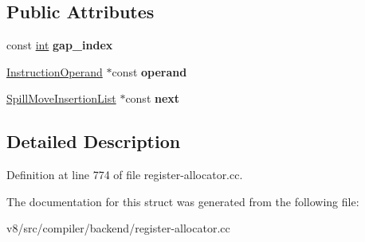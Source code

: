 \subsection*{Public Attributes}
\begin{DoxyCompactItemize}
\item 
\mbox{\label{structv8_1_1internal_1_1compiler_1_1TopLevelLiveRange_1_1SpillMoveInsertionList_a0e4f977b3614d4d7d3b464ddc769a811}} 
const \mbox{\hyperlink{classint}{int}} {\bfseries gap\+\_\+index}
\item 
\mbox{\label{structv8_1_1internal_1_1compiler_1_1TopLevelLiveRange_1_1SpillMoveInsertionList_a512610e684d7763eaa474caff5b7c371}} 
\mbox{\hyperlink{classv8_1_1internal_1_1compiler_1_1InstructionOperand}{Instruction\+Operand}} $\ast$const {\bfseries operand}
\item 
\mbox{\label{structv8_1_1internal_1_1compiler_1_1TopLevelLiveRange_1_1SpillMoveInsertionList_a5d16ff66efe61295d30bea6945c48cbe}} 
\mbox{\hyperlink{structv8_1_1internal_1_1compiler_1_1TopLevelLiveRange_1_1SpillMoveInsertionList}{Spill\+Move\+Insertion\+List}} $\ast$const {\bfseries next}
\end{DoxyCompactItemize}


\subsection{Detailed Description}


Definition at line 774 of file register-\/allocator.\+cc.



The documentation for this struct was generated from the following file\+:\begin{DoxyCompactItemize}
\item 
v8/src/compiler/backend/register-\/allocator.\+cc\end{DoxyCompactItemize}
